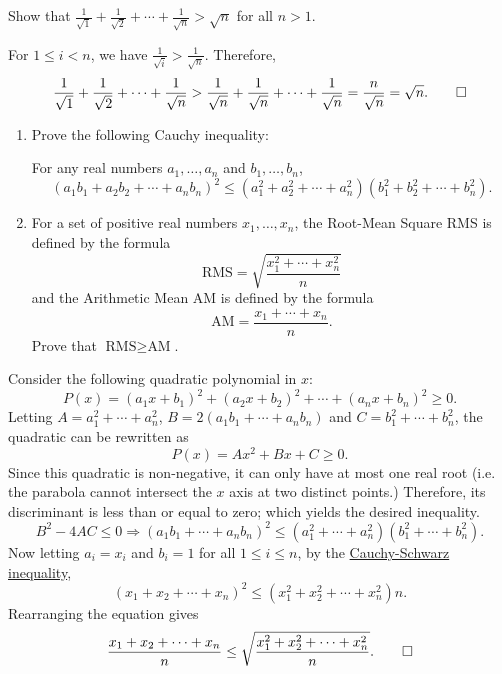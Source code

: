 \begin{question}
    Show that $\frac{1}{\sqrt{1}} + \frac{1}{\sqrt{2}} + \cdots +
    \frac{1}{\sqrt{n}} > \sqrt{n}$ for all $n > 1$.
\end{question}
\begin{solution}
    For $1 \leq i < n$, we have $\frac{1}{\sqrt{i}} > \frac{1}{\sqrt{n}}$.
    Therefore,
    \[ \frac{1}{\sqrt{1}} + \frac{1}{\sqrt{2}} + \cdots + \frac{1}{\sqrt{n}} >
    \frac{1}{\sqrt{n}} + \frac{1}{\sqrt{n}} + \cdots + \frac{1}{\sqrt{n}} =
    \frac{n}{\sqrt{n}} = \sqrt{n}. \qedhere \]
\end{solution}

\begin{question}
    \begin{enumerate}
        \item Prove the following Cauchy inequality:
            \par For any real numbers $a_1, \ldots, a_n$ and $b_1, \ldots, b_n$,
            \[(a_{1}b_{1} + a_{2}b_{2} + \cdots +a_{n}b_{n})^2\leq (a_{1}^2 +
            a_{2}^2 + \cdots + a_{n}^2)(b_{1}^2 + b_{2}^2 + \cdots + b_{n}^2).\]
        
        \item For a set of positive real numbers $x_1, \ldots, x_n$, the
            Root-Mean Square RMS is defined by the formula 
            \[\text{RMS} = \sqrt{\frac{x_{1}^2 + \cdots + x_{n}^2}{n}}\] 
            and the Arithmetic Mean AM is defined by the formula 
            \[\text{AM} = \frac{x_{1} + \cdots + x_{n}}{n}.\] 
            Prove that $\text{RMS} \geq \text{AM}$.
    \end{enumerate}
\end{question}
\begin{solution}
    Consider the following quadratic polynomial in $x$:
    \[ P(x) = (a_1x + b_1)^2 + (a_2x + b_2)^2 + \cdots + (a_nx + b_n)^2 \geq 0.
    \]
    Letting $A = a_1^2 + \cdots + a_n^2$, $B = 2(a_1b_1 + \cdots + a_nb_n)$ and
    $C = b_1^2 + \cdots + b_n^2$, the quadratic can be rewritten as
    \[ P(x) = Ax^2 + Bx + C \geq 0. \]
    Since this quadratic is non-negative, it can only have at most one real
    root (i.e. the parabola cannot intersect the $x$ axis at two distinct
    points.) Therefore, its discriminant is less than or equal to zero; which
    yields the desired inequality.
    \[ B^2 - 4AC \leq 0 \Longrightarrow (a_1b_1 + \cdots + a_nb_n)^2 \leq
    (a_1^2 + \cdots + a_n^2)(b_1^2 + \cdots +b_n^2). \]
    Now letting $a_i = x_i$ and $b_i = 1$ for all $1 \leq i \leq n$, by the
    \hyperref[thm: cs]{Cauchy-Schwarz inequality},
    \[ (x_1 + x_2 + \cdots + x_n)^2 \leq (x_1^2 + x_2^2 + \cdots + x_n^2)n. \]
    Rearranging the equation gives
    \[ \frac{x_1 + x_2 + \cdots + x_n}{n} \leq \sqrt{\frac{x_1^2 + x_2^2 +
    \cdots + x_n^2}{n}}. \qedhere \]
\end{solution}

